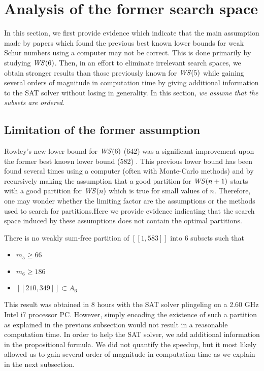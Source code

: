 \section{Analysis of the former search space}
\label{SearchSpace}

\qquad \hypertarget{sat}{In} this section, we first provide evidence which indicate that the main assumption made by papers which
found the previous best known lower bounds for weak Schur numbers using a computer may not be correct. 
This is done primarily by studying \(\mathit{WS}(6)\). Then, in an effort to eliminate irrelevant search spaces, we 
obtain stronger results than those previously known for \(\mathit{WS} (5)\) while gaining several orders of magnitude 
in computation time by giving additional information to the SAT solver without losing in generality. In this 
section, \textit{we assume that the subsets are ordered}.


\subsection{Limitation of the former assumption}

\qquad Rowley's new lower bound for \(\mathit{WS} (6)\) (642) \cite{RowleyWS} was a significant improvement upon
the former best known lower bound (582) \cite{EliahouBook}. This previous lower bound has been found 
several times using a computer (often with Monte-Carlo methods) and by recursively making the assumption 
that a good partition for \(\mathit{WS} (n+1)\) starts with a good partition for \(\mathit{WS} (n)\) which is true for small
values of \(n\). Therefore, one may wonder whether the limiting factor are the assumptions or the 
methods used to search for partitions.Here we provide evidence indicating that the search space induced by 
these assumptions does not contain the optimal partitions.

\begin{computational theorem}
There is no weakly sum-free partition of \([\![1,583]\!]\) into 6 subsets such that
\begin{itemize}
	\item \(m_5 \geqslant 66\)
	\item \(m_6 \geqslant 186\)
	\item \([\![210,349]\!] \subset A_6\)
\end{itemize}
\end{computational theorem}

This result was obtained in 8 hours with the SAT solver plingeling \cite{Lingeling2017} on a 2.60 GHz Intel
i7 processor PC.
However, simply encoding the existence of such a partition as explained in the previous subsection would not result in a
reasonable
computation time. In order to help the SAT solver, we add additional information in the propositional formula. We did
not quantify the
speedup, but it most likely allowed us to gain several order of magnitude in computation time as we explain in the next
subsection.

